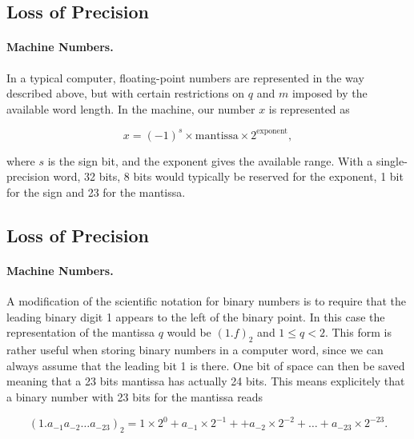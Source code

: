 \documentclass[%
oneside,                 %
final,                   %
10pt]{article}
\begin{document}
\subsection*{Loss of Precision}


\paragraph{Machine Numbers.}
In a typical computer, floating-point numbers are represented
in the way described above, but with certain restrictions
on $q$ and $m$ imposed by the available word length.
In the machine, our
number $x$ is represented as

\begin{equation}
    x=(-1)^s\times {\mbox{mantissa}}\times 2^{{\mbox{exponent}}},
\end{equation}

where $s$ is the sign bit, and the exponent gives the available range.
With a single-precision word, 32 bits, 8 bits would typically be reserved
for the exponent,  1 bit for the sign and 23 for the mantissa.



\subsection*{Loss of Precision}


\paragraph{Machine Numbers.}
A modification of the scientific notation for binary numbers is to
require that the leading binary digit 1 appears to the left of the binary point.
In this case the representation of the mantissa $q$ would be
$(1.f)_2$ and $ 1 \le q < 2$. This form is rather useful when storing
binary numbers in a computer word, since we can always assume that the leading
bit 1 is there. One bit of space can then be saved meaning that a 23 bits
mantissa has actually 24 bits. This means explicitely that a binary number with 23 bits
for the mantissa reads

\begin{equation}
(1.a_{-1}a_{-2}\dots a_{-23})_2=1\times 2^0+a_{-1}\times 2^{-1}+
+a_{-2}\times 2^{-2}+\dots+a_{-23}\times 2^{-23}.
\end{equation}
\end{document}

